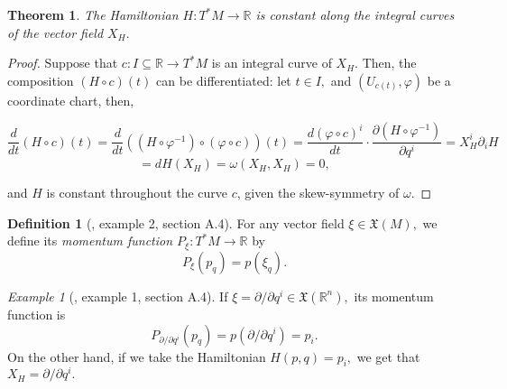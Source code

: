 \documentclass[12pt, letterpaper, reqno]{amsart}
\theoremstyle{definition}
\newtheorem{df}{Definition}
\theoremstyle{plain}
\newtheorem{thm}{Theorem}
\theoremstyle{remark}
\newtheorem{ex}{Example}
\begin{document}
\begin{thm}\label{thm:constantCurves}
The Hamiltonian $ H: T^*M \rightarrow \mathbb{R} $ is constant along the integral curves of the vector field $ X_H. $ 	
\end{thm}

\begin{proof}
	Suppose that $ c:I\subseteq \mathbb{R} \rightarrow T^*M $ is an integral curve of $ X_H. $ Then, the composition $ (H\circ c) (t) $ can be differentiated: let $ t\in I, $ and $ (U_{c(t)}, \varphi) $ be a coordinate chart, then, 
		
	$$ \frac{d}{dt} (H\circ c)(t) = \frac{d}{dt} \left( \left( H\circ \varphi^{-1} \right)\circ \left( \varphi\circ c \right) \right)(t) = \frac{d(\varphi\circ c)^i}{dt}\cdot \frac{\partial (H\circ \varphi^{-1})}{\partial q^i}= X_H^i \partial_i H $$ $$= dH(X_H)=\omega(X_H, X_H)=0,$$    

	and $ H $ is constant throughout the curve $ c $, given the skew-symmetry of $ \omega $. 
\end{proof}

\begin{df}[\cite{montgomery2002tour}, example 2, section A.4]
	For any vector field $ \xi\in \mathfrak{X}(M), $ we define its \textit{ momentum function $ P_\xi:T^*M \rightarrow \mathbb{R} $} by
	$$ P_\xi(p_q)= p(\xi_q). $$ 
\end{df}

\begin{ex}[\cite{montgomery2002tour}, example 1, section A.4]
	If $ \xi=\partial/\partial q^i\in \mathfrak{X}( \mathbb{R}^n), $ its momentum function is
	$$ P_{\partial/\partial q^i}(p_q)=p(\partial/\partial q^i) = p_i. $$ 
	On the other hand, if we take the Hamiltonian $ H(p,q)=p_i, $ we get that $ X_H=\partial /\partial q^i. $ 
\end{ex}
\end{document}

